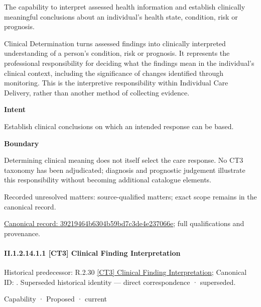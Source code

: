 The capability to interpret assessed health information and establish clinically meaningful conclusions about an individual's health state, condition, risk or prognosis.



Clinical Determination turns assessed findings into clinically interpreted understanding of a person's condition, risk or prognosis. It represents the professional responsibility for deciding what the findings mean in the individual's clinical context, including the significance of changes identified through monitoring. This is the interpretive responsibility within Individual Care Delivery, rather than another method of collecting evidence.



\textbf{Intent}



Establish clinical conclusions on which an intended response can be based.



\textbf{Boundary}



Determining clinical meaning does not itself select the care response. No CT3 taxonomy has been adjudicated; diagnosis and prognostic judgement illustrate this responsibility without becoming additional catalogue elements.


{\small Recorded unresolved matters: source-qualified matters; exact scope remains in the canonical record.}\par
{\footnotesize \href{../../../../continuum/strategy/capability/39219464b6304b59bd7c3de4e237066e.md}{Canonical record: 39219464b6304b59bd7c3de4e237066e}; full qualifications and provenance.}\par
\paragraph*{II.1.2.14.1.1 [CT3] Clinical Finding Interpretation}
\label{navigation:II.1.2.14.1.1}

{\small Historical predecessor: R.2.30 \hyperref[element:cf8ddfca7a8e4ed893ec39b795200d77]{[CT3] Clinical Finding Interpretation}; Canonical ID: \texttt{}. Superseded historical identity — direct correspondence · superseded.}\par
\label{element:deb78ba3b1514074a8ca5bc5da0673f5}
{\small Capability · Proposed · current}\par

